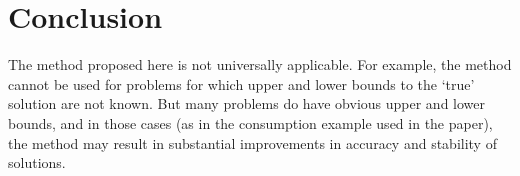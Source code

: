 \documentclass[titlepage, headings=optiontotocandhead]{econtex}
\begin{document}
\hypertarget{conclusion}{}
\section{Conclusion}

The method proposed here is not universally applicable.  For example, the method cannot be used for problems for which upper and lower bounds to the `true' solution are not known.  But many problems do have obvious upper and lower bounds, and in those cases (as in the consumption example used in the paper), the method may result in substantial improvements in accuracy and stability of solutions.

\vfill\clearpage
 
\end{document}

